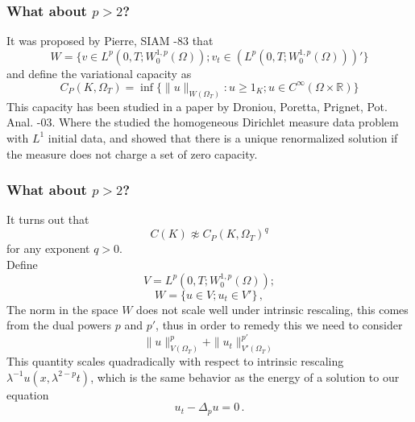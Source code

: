 \documentclass[10pt]{beamer}
\newcommand{\R}{\mathbb{R}}
\begin{document}
\begin{frame}
	\frametitle{What about $p > 2$?}
	It was proposed by Pierre, SIAM -83 that
	\begin{equation} \nonumber \label{}
		W = \{v \in L^p(0,T;W_0^{1,p}(\Omega)); v_t \in (L^p(0,T;W_0^{1,p}(\Omega)))'\}
	\end{equation}
	\pause
	and define the variational capacity as
	\begin{equation} 
		C_{P}(K,\Omega_T) = \inf \{ \|u \|_{W(\Omega_T)}: u \geq 1_K; u \in C^\infty(\Omega \times \R) \}
	\end{equation}
	This capacity has been studied in a paper by Droniou, Poretta, Prignet, Pot. Anal. -03. Where the studied the homogeneous Dirichlet measure data problem with $L^1$ initial data, and showed that there is a unique renormalized solution if the measure does not charge a set of zero capacity.
\end{frame}

\begin{frame}
	\frametitle{What about $p > 2$?}
	It turns out that 
	\begin{equation} \nonumber \label{}
		C(K) \not \approx C_{P}(K,\Omega_T)^q
	\end{equation}
	for any exponent $q > 0$. \\
	\pause
	Define
	\begin{equation} \nonumber \label{}
		V = L^p(0,T;W_0^{1,p}(\Omega));
	\end{equation}
	\begin{equation} \nonumber \label{}
		W = \{ u \in V; u_t \in V'\}\,,
	\end{equation}
	The norm in the space $W$ does not scale well under intrinsic rescaling, this comes from the dual powers $p$ and $p'$, thus in order to remedy this we need to consider
	\begin{equation} \nonumber \label{}
		\|u \|_{V(\Omega_T)}^p + \|u_t\|_{V'(\Omega_T)}^{p'}
	\end{equation}
	\pause
	This quantity scales quadradically with respect to intrinsic rescaling $\lambda^{-1} u(x,\lambda^{2-p} t)$, which is the same behavior as the energy of a solution to our equation
	\begin{equation} \nonumber \label{}
		u_t - \Delta_p u = 0\,.
	\end{equation}
\end{frame}
\end{document}
